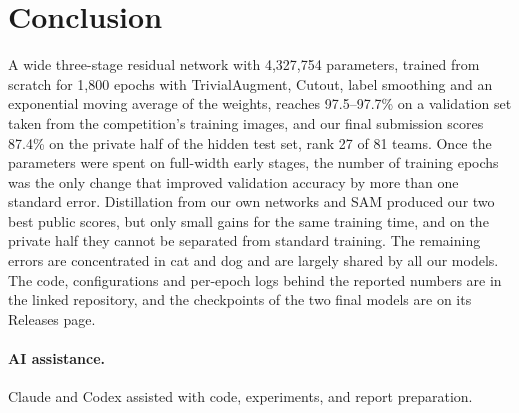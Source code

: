 \documentclass[letterpaper]{article}
\begin{document}
\section{Conclusion}
A wide three-stage residual network with 4,327,754 parameters, trained from scratch for 1,800 epochs with TrivialAugment, Cutout, label
smoothing and an exponential moving average of the weights, reaches 97.5--97.7\% on a validation set taken from the competition's
training images, and our final submission scores 87.4\% on the private half of the hidden test set, rank 27 of 81 teams. Once the parameters were spent on full-width early stages,
the number of training epochs was the only change that improved validation accuracy by more than one standard error. Distillation from
our own networks and SAM produced our two best public scores, but only small gains for the same training time, and on the private half they cannot be separated from standard training. The remaining errors are concentrated in cat and dog and are largely shared by all our models. The code, configurations
and per-epoch logs behind the reported numbers are in the linked repository, and the checkpoints of the two final models are on its
Releases page.

\paragraph{AI assistance.} Claude and Codex assisted with code, experiments, and report preparation.



\end{document}
